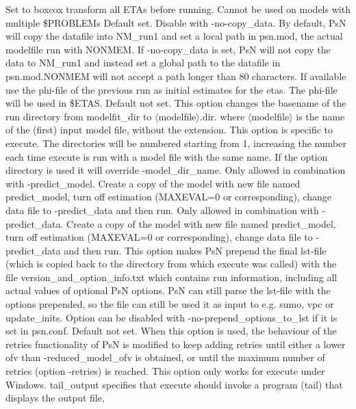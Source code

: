 \begin{optionlist}
 Set to boxcox transform all ETAs before running. Cannot be used
 on models with multiple \$PROBLEMs
\nextopt
{}
Default set. Disable with -no-copy\_data. By default, PsN will copy the datafile into NM\_run1 and set a local path in psn.mod, the actual 
modelfile run with NONMEM. If -no-copy\_data is set, PsN will not copy the data to NM\_run1 and instead set a global path to the datafile 
in psn.mod.NONMEM will not accept a path longer than 80 characters.
\nextopt
{}
 If available use the phi-file of the previous run as initial estimates for the etas. The phi-file will be used in \$ETAS.
\nextopt
{}
Default not set. 
This option changes the basename of the run directory from modelfit\_dir 
to $\langle$modelfile$\rangle$.dir. where $\langle$modelfile$\rangle$ 
is the name of the (first) input model file, without the extension. 
This option is specific to execute.
The directories will be numbered starting from 1, increasing the number each time execute is run with a model file with the 
same name. If the option directory is used it will override -model\_dir\_name.
\nextopt
{}
Only allowed in combination with -predict\_model.
Create a copy of the model with new file named predict\_model, turn off estimation 
(MAXEVAL=0 or corresponding), change data file to -predict\_data and then run.
\nextopt
{}
Only allowed in combination with -predict\_data.
Create a copy of the model with new file named predict_model, turn off estimation (MAXEVAL=0 or corresponding), change data file to 
-predict\_data and then run.
\nexopt
{} 
This option makes PsN prepend the final lst-file (which is copied back to the directory from which execute was called) with the file 
version_and_option_info.txt which contains run information,  including all actual values of optional PsN options. PsN can still parse the 
lst-file with the options prepended, so the file can still be used it as  input to e.g. sumo, vpc or update\_inits. Option can be disabled with 
-no-prepend\_options\_to\_lst if it is set in psn.conf. 
\nextopt
{}
 Default not set. When this option is used, the behaviour of the retries functionality of PsN is modified to keep adding retries until either a 
 lower ofv than -reduced_model_ofv is obtained, or until the maximum number of retries (option -retries) is reached.
\nextopt
{} 
This option only works for execute under Windows. tail\_output specifies that execute should invoke a program (tail) that displays the output file, 

\end{optionlist}
